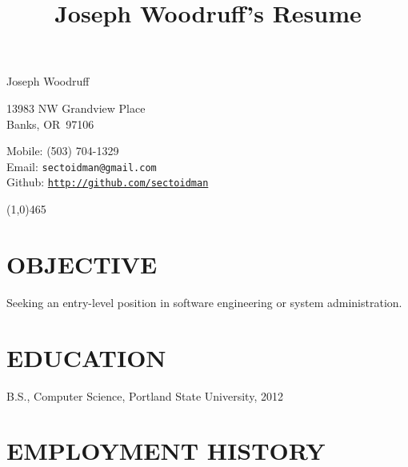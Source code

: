 \documentclass{article}
\title{Joseph Woodruff's Resume}
\makeatletter
\newcommand{\name}{Joseph Woodruff}
\newcommand{\address}{13983 NW Grandview Place}
\newcommand{\city}{Banks}
\newcommand{\state}{OR}
\newcommand{\zip}{97106}
\newcommand{\phone}{(503) 704-1329}
\newcommand{\email}{sectoidman@gmail.com}
\newcommand{\webpage}{http://github.com/sectoidman}
\makeatother
\begin{document}
{\huge \name}

\vspace{0.125in}

\begin{minipage}[t]{0.5\textwidth}
	\address\\
	\city, \state\ \zip
\end{minipage}
\begin{minipage}[t]{0.5\textwidth}
	Mobile: \phone \\
	Email: \texttt{\email} \\Github: \texttt{\url{\webpage}} \\
\end{minipage}

\begin{center}
\line(1,0){465}
\end{center}

\section*{OBJECTIVE}
	Seeking an entry-level position in software engineering or system administration.

\section*{EDUCATION}
	B.S., Computer Science, Portland State University, 2012


\renewenvironment{itemize}{
	\begin{list}{$\bullet$}{
	\setlength{\leftmargin}{1.5em}
	\setlength{\itemsep}{0.25em}
	\setlength{\parskip}{0pt}
	\setlength{\parsep}{0.25em}
}
}{
	\end{list}
}

\section*{EMPLOYMENT HISTORY}
\end{document}
